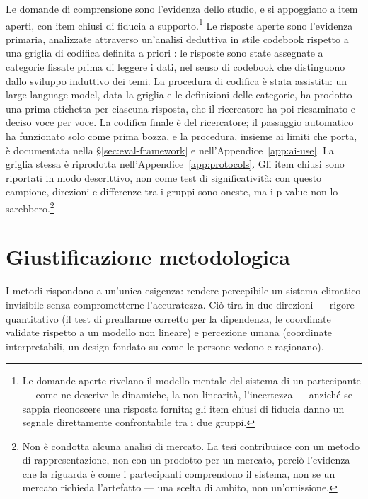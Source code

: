 Le domande di comprensione sono l'evidenza dello studio, e si appoggiano a item aperti, con item chiusi di fiducia a supporto.\footnote{Le domande aperte rivelano il modello mentale del sistema di un partecipante --- come ne descrive le dinamiche, la non linearità, l'incertezza --- anziché se sappia riconoscere una risposta fornita; gli item chiusi di fiducia danno un segnale direttamente confrontabile tra i due gruppi.} Le risposte aperte sono l'evidenza primaria, analizzate attraverso un'analisi deduttiva in stile codebook rispetto a una griglia di codifica definita a priori \citep{braunclarke2019}: le risposte sono state assegnate a categorie fissate prima di leggere i dati, nel senso di codebook che \textcite{braunclarke2019} distinguono dallo sviluppo induttivo dei temi. La procedura di codifica è stata assistita: un large language model, data la griglia e le definizioni delle categorie, ha prodotto una prima etichetta per ciascuna risposta, che il ricercatore ha poi riesaminato e deciso voce per voce. La codifica finale è del ricercatore; il passaggio automatico ha funzionato solo come prima bozza, e la procedura, insieme ai limiti che porta, è documentata nella \S\ref{sec:eval-framework} e nell'Appendice~\ref{app:ai-use}. La griglia stessa è riprodotta nell'Appendice~\ref{app:protocols}. Gli item chiusi sono riportati in modo descrittivo, non come test di significatività: con questo campione, direzioni e differenze tra i gruppi sono oneste, ma i p-value non lo sarebbero.\footnote{Non è condotta alcuna analisi di mercato. La tesi contribuisce con un metodo di rappresentazione, non con un prodotto per un mercato, perciò l'evidenza che la riguarda è come i partecipanti comprendono il sistema, non se un mercato richieda l'artefatto --- una scelta di ambito, non un'omissione.}

\section{Giustificazione metodologica}
\label{sec:justification}

I metodi rispondono a un'unica esigenza: rendere percepibile un sistema climatico invisibile senza comprometterne l'accuratezza. Ciò tira in due direzioni --- rigore quantitativo (il test di preallarme corretto per la dipendenza, le coordinate validate rispetto a un modello non lineare) e percezione umana (coordinate interpretabili, un design fondato su come le persone vedono e ragionano).

